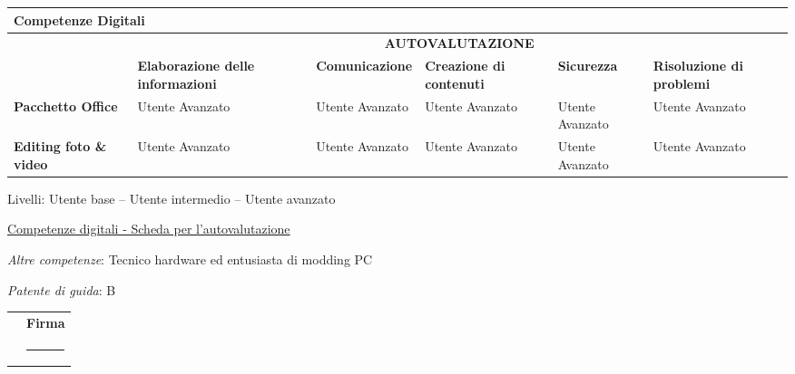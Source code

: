 \documentclass[a4paper, 10pt]{article}
\begin{document}
	\begin{table}[h!]
		\centering
		\renewcommand\arraystretch{1.5}
		\renewcommand\tabularxcolumn[1]{>{\centering\arraybackslash}m{#1}}
		\setlength{\tabcolsep}{6pt}
		\begin{tabularx}{\textwidth}{l*{5}{X}}
			\multicolumn{6}{l}{\textbf{{Competenze Digitali}}} \\[4pt]
			\toprule
			& \multicolumn{5}{c}{\textbf{{AUTOVALUTAZIONE}}} \\
			\hdashline
			& {\textbf{Elaborazione delle informazioni}}
			& {\textbf{Comunicazione}}
			& {\textbf{Creazione di contenuti}}
			& {\textbf{Sicurezza}}
			& {\textbf{Risoluzione di problemi}} \\
			\midrule
			\textbf{Pacchetto Office} & Utente Avanzato & Utente Avanzato & Utente Avanzato & Utente Avanzato & Utente Avanzato \\
			\textbf{Editing foto \& video} & Utente Avanzato & Utente Avanzato & Utente Avanzato & Utente Avanzato & Utente Avanzato \\
			\bottomrule
		\end{tabularx}
		
		\vspace{4pt}
		{\footnotesize
			{Livelli: Utente base – Utente intermedio – Utente avanzato} \par
			\href{https://www.cittadinanzadigitale.eu/wp-content/uploads/2015/10/Competenze-digitali.pdf}{Competenze digitali - Scheda per l'autovalutazione}
		}
	\end{table}
	
	\skillListStart
	\justifying
	\item \emph{Altre competenze}: Tecnico hardware ed entusiasta di modding PC
	\item \emph{Patente di guida}: B
	\skillListEnd
	
	\vspace{1cm}
	
	
	\begin{tabularx}{\textwidth}{>{\centering\arraybackslash}X >{\centering\arraybackslash}X}
		{\textbf{Data}} &
		{\textbf{Firma}} \\[0.3cm]
		\rule{4cm}{0.3pt} & \rule{4cm}{0.3pt} \\[-0.1cm]
	\end{tabularx}
	
\end{document}
